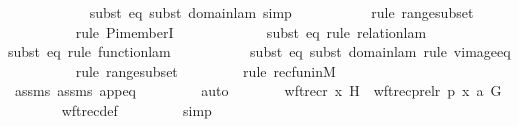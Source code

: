 \begin{isabellebody}
\ \ \ \ \ \ \ \ \ \ \ \isamarkupfalse%
{\isacharparenleft}{\kern0pt}subst\ eq{}{\isacharcomma}{\kern0pt}\ subst\ domain{\isacharunderscore}{\kern0pt}lam{\isacharcomma}{\kern0pt}\ simp{\isacharparenright}{\kern0pt}\isanewline
\ \ \ \ \ \ \ \ \ \ \isamarkupfalse%
{\isacharparenleft}{\kern0pt}rule\ rangesubset{\isacharparenright}{\kern0pt}\isanewline
\ \ \ \ \ \ \ \ \ \isamarkupfalse%
{\isacharparenleft}{\kern0pt}rule\ Pi{\isacharunderscore}{\kern0pt}memberI{\isacharparenright}{\kern0pt}\isanewline
\ \ \ \ \ \ \ \ \ \ \ \ \isamarkupfalse%
{\isacharparenleft}{\kern0pt}subst\ eq{}{\isacharcomma}{\kern0pt}\ rule\ relation{\isacharunderscore}{\kern0pt}lam{\isacharparenright}{\kern0pt}\isanewline
\ \ \ \ \ \ \ \ \ \ \ \isamarkupfalse%
{\isacharparenleft}{\kern0pt}subst\ eq{}{\isacharcomma}{\kern0pt}\ rule\ function{\isacharunderscore}{\kern0pt}lam{\isacharparenright}{\kern0pt}\isanewline
\ \ \ \ \ \ \ \ \ \ \isamarkupfalse%
{\isacharparenleft}{\kern0pt}subst\ eq{}{\isacharcomma}{\kern0pt}\ subst\ domain{\isacharunderscore}{\kern0pt}lam{\isacharcomma}{\kern0pt}\ rule\ vimageeq{\isacharparenright}{\kern0pt}\isanewline
\ \ \ \ \ \ \ \ \ \isamarkupfalse%
{\isacharparenleft}{\kern0pt}rule\ rangesubset{}{\isacharparenright}{\kern0pt}\isanewline
\ \ \ \ \ \ \ \ \isamarkupfalse%
{\isacharparenleft}{\kern0pt}rule\ recfun{}inM{\isacharparenright}{\kern0pt}\isanewline
\ \ \ \ \ \ \isamarkupfalse%
\ assms\ assms{}\ app{\isacharunderscore}{\kern0pt}eq\ \isanewline
\ \ \ \ \ \ \isamarkupfalse%
\ auto\isanewline
\ \ \ \ \isamarkupfalse%
\ \isamarkupfalse%
\ {\isachardoublequoteopen}wftrec{\isacharparenleft}{\kern0pt}r{\isacharcomma}{\kern0pt}\ x{\isacharcomma}{\kern0pt}\ H{\isacharparenright}{\kern0pt}\ {\isacharequal}{\kern0pt}\ wftrec{\isacharparenleft}{\kern0pt}prel{\isacharparenleft}{\kern0pt}r{\isacharcomma}{\kern0pt}\ p{\isacharparenright}{\kern0pt}{\isacharcomma}{\kern0pt}\ {\isasymlangle}x{\isacharcomma}{\kern0pt}\ a{\isasymrangle}{\isacharcomma}{\kern0pt}\ G{\isacharparenright}{\kern0pt}{\isachardoublequoteclose}\isanewline
\ \ \ \ \ \ \isamarkupfalse%
\ wftrec{\isacharunderscore}{\kern0pt}def\ \isanewline
\ \ \ \ \ \ \isamarkupfalse%
\ simp\isanewline
\ \ \isamarkupfalse%
\isanewline
\isanewline
\ \ \isamarkupfalse%

\end{isabellebody}
